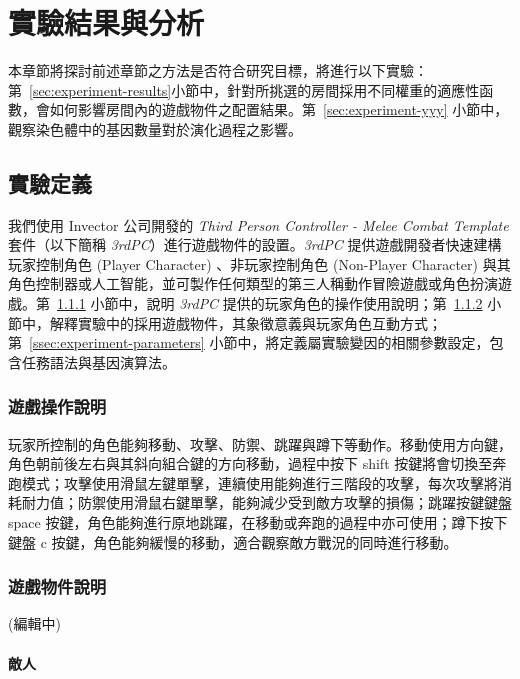 \chapter{實驗結果與分析}
\label{cha:experiment}

本章節將探討前述章節之方法是否符合研究目標，將進行以下實驗：第~\ref{sec:experiment-results}小節中，針對所挑選的房間採用不同權重的適應性函數，會如何影響房間內的遊戲物件之配置結果。第~\ref{sec:experiment-yyy} 小節中，觀察染色體中的基因數量對於演化過程之影響。

\section{實驗定義}
\label{sec:experiment-definition}

我們使用 Invector 公司開發的 \textit{Third Person Controller - Melee Combat Template} 套件（以下簡稱 \textit{3rdPC}）進行遊戲物件的設置。\textit{3rdPC} 提供遊戲開發者快速建構玩家控制角色 (Player Character) 、非玩家控制角色 (Non-Player Character) 與其角色控制器或人工智能，並可製作任何類型的第三人稱動作冒險遊戲或角色扮演遊戲。第~\ref{ssec:experiment-gameplaymanual} 小節中，說明 \textit{3rdPC} 提供的玩家角色的操作使用說明；第~\ref{ssec:experiment-gameobjects} 小節中，解釋實驗中的採用遊戲物件，其象徵意義與玩家角色互動方式；第~\ref{ssec:experiment-parameters} 小節中，將定義屬實驗變因的相關參數設定，包含任務語法與基因演算法。

\subsection{遊戲操作說明}
\label{ssec:experiment-gameplaymanual}

玩家所控制的角色能夠移動、攻擊、防禦、跳躍與蹲下等動作。移動使用方向鍵，角色朝前後左右與其斜向組合鍵的方向移動，過程中按下 shift 按鍵將會切換至奔跑模式；攻擊使用滑鼠左鍵單擊，連續使用能夠進行三階段的攻擊，每次攻擊將消耗耐力值；防禦使用滑鼠右鍵單擊，能夠減少受到敵方攻擊的損傷；跳躍按鍵鍵盤 space 按鍵，角色能夠進行原地跳躍，在移動或奔跑的過程中亦可使用；蹲下按下鍵盤 c 按鍵，角色能夠緩慢的移動，適合觀察敵方戰況的同時進行移動。

\subsection{遊戲物件說明}
\label{ssec:experiment-gameobjects}

(編輯中)

\subsubsection{敵人}
\label{sssec:experiment-gameobjects-enemy}

